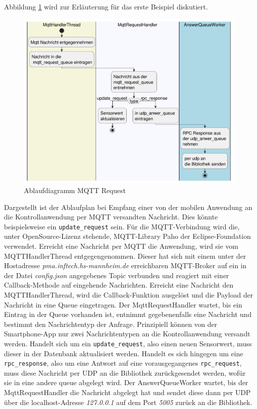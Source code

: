 \documentclass[11pt,a4paper]{report}
\begin{document}
Abbildung \ref{fig:serverMqttReqPath} wird zur Erläuterung für das erste Beispiel diskutiert.
\begin{figure}[htbp]
  \centering
  \includegraphics[width=\textwidth]{images/MqttRequestServerPath}
  \caption{Ablaufdiagramm MQTT Request}
  \label{fig:serverMqttReqPath}
\end{figure}
Dargestellt ist der Ablaufplan bei Empfang einer von der mobilen Anwendung an die Kontrollanwendung per MQTT versandten Nachricht.
Dies könnte beispielsweise ein \texttt{update\_request} sein.
Für die MQTT-Verbindung wird die, unter OpenSource-Lizenz stehende, MQTT-Library Paho \cite{paho} der Eclipse-Foundation verwendet. 
Erreicht eine Nachricht per MQTT die Anwendung, wird sie vom MQTTHandlerThread entgegengenommen.
Dieser hat sich mit einem unter der Hostadresse \textit{pma.inftech.hs-mannheim.de} erreichbaren MQTT-Broker auf ein in der Datei \textit{config.json} angegebenes Topic verbunden und reagiert mit einer Callback-Methode auf eingehende Nachrichten.
Erreicht eine Nachricht den MQTTHandlerThread, wird die Callback-Funktion ausgelöst und die Payload der Nachricht in eine Queue eingetragen.
Der MqttRequestHandler wartet, bis ein Eintrag in der Queue vorhanden ist, entnimmt gegebenenfalls eine Nachricht und bestimmt den Nachrichtentyp der Anfrage.
Prinzipiell können von der Smartphone-App nur zwei Nachrichtentypen an die Kontrollanwendung versandt werden.
Handelt sich um ein \texttt{update\_request}, also einen neuen Sensorwert, muss dieser in der Datenbank aktualisiert werden.
Handelt es sich hingegen um eine \texttt{rpc\_response}, also um eine Antwort auf eine vorausgegangenes \texttt{rpc\_request}, muss diese Nachricht per UDP an die Bibliothek zurückgesendet werden, wofür sie in eine andere queue abgelegt wird.
Der AnswerQueueWorker wartet, bis der MqttRequestHandler die Nachricht abgelegt hat und sendet diese dann per UDP über die localhost-Adresse \textit{127.0.0.1} auf dem Port \textit{5005} zurück an die Bibliothek.
\end{document}
